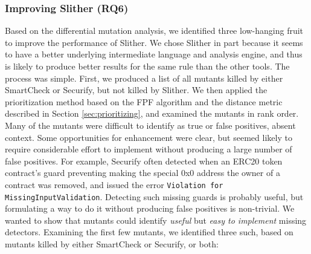 \subsubsection{Improving Slither {\bf (RQ6)}}

Based on the differential mutation analysis, we identified three low-hanging fruit to improve the performance of Slither.  We chose Slither in part because it seems to have a better underlying intermediate language and analysis engine, and thus is likely to produce better results for the same rule than the other tools.  The process was simple.  First, we produced a list of all mutants killed by either SmartCheck or Securify, but not killed by Slither.  We then applied the prioritization method based on the FPF algorithm and the distance metric described in Section \ref{sec:prioritizing}, and examined the mutants in rank order.  Many of the mutants were difficult to identify as true or false positives, absent context.  Some opportunities for enhancement were clear, but seemed likely to require considerable effort to implement without producing a large number of false positives.  For example, Securify often detected when an ERC20 token contract's guard preventing making the special 0x0 address the owner of a contract was removed, and issued the error {\tt Violation for MissingInputValidation}. Detecting such missing guards is probably useful, but formulating a way to do it without producing false positives is non-trivial.  We wanted to show that mutants could identify \emph{useful} but \emph{easy to implement} missing detectors.  Examining the first few mutants, we identified three such, based on mutants killed by either SmartCheck or Securify, or both:

